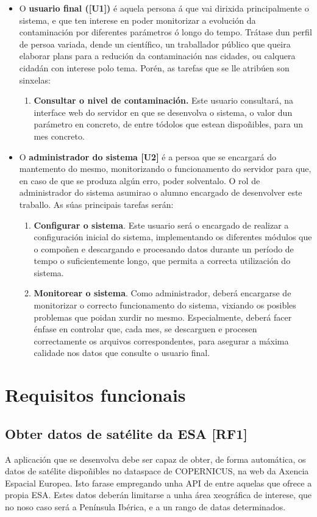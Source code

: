 \begin{itemize}
    \item O \textbf{usuario final ([U1])} é aquela persona á que vai dirixida principalmente o sistema, e que ten interese en poder monitorizar a evolución da contaminación por
    diferentes parámetros ó longo do tempo. Trátase dun perfil de persoa variada, dende un científico, un traballador público que queira elaborar plans para a redución da contaminación
    nas cidades, ou calquera cidadán con interese polo tema. Porén, as tarefas que se lle atribúen son sinxelas:
    \begin{enumerate}
        \item \textbf{Consultar o nivel de contaminación.} Este usuario consultará, na interface web do servidor en que se desenvolva o sistema, o valor dun parámetro en concreto, de entre
        tódolos que estean dispoñibles, para un mes concreto.
    \end{enumerate}
    \item O \textbf{administrador do sistema [U2]} é a persoa que se encargará do mantemento do mesmo, monitorizando o funcionamento do servidor para que, en caso de que se produza algún
    erro, poder solventalo. O rol de administrador do sistema asumirao o alumno encargado de desenvolver este traballo. As súas principais tarefas serán:
    \begin{enumerate}
        \item \textbf{Configurar o sistema}. Este usuario será o encargado de realizar a configuración inicial do sistema, implementando os diferentes módulos que o compoñen
        e descargando e procesando datos durante un período de tempo o suficientemente longo, que permita a correcta utilización do sistema.
        \item \textbf{Monitorear o sistema}. Como administrador, deberá encargarse de monitorizar o correcto funcionamento do sistema, vixiando os posibles problemas que poidan xurdir no
        mesmo. Especialmente, deberá facer énfase en controlar que, cada mes, se descarguen e procesen correctamente os arquivos correspondentes, para asegurar a máxima calidade nos datos
        que consulte o usuario final.
    \end{enumerate}
\end{itemize}


\section{Requisitos funcionais}
\subsection{Obter datos de satélite da ESA [RF1]}\label{rf1}
A aplicación que se desenvolva debe ser capaz de obter, de forma automática, os datos de satélite dispoñibles no dataspace de COPERNICUS,
na web da Axencia Espacial Europea. Isto farase empregando unha API de entre aquelas que ofrece a propia ESA. Estes datos deberán limitarse
a unha área xeográfica de interese, que no noso caso será a Península Ibérica, e a un rango de datas determinados.

